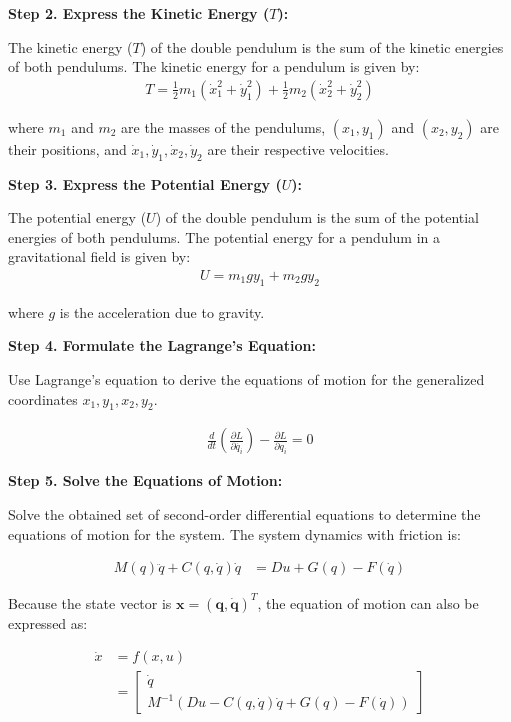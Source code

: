 \textbf{Step 2. Express the Kinetic Energy (\(T\)):}

   The kinetic energy (\(T\)) of the double pendulum is the sum of the kinetic energies of both pendulums. The kinetic energy for a pendulum is given by:
   \begin{align}
        T = \frac{1}{2} m_1 (\dot{x}_1^2 + \dot{y}_1^2) + \frac{1}{2} m_2 (\dot{x}_2^2 + \dot{y}_2^2)
   \end{align}

   where \(m_1\) and \(m_2\) are the masses of the pendulums, \((x_1, y_1)\) and \((x_2, y_2)\) are their positions, and \(\dot{x}_1, \dot{y}_1, \dot{x}_2, \dot{y}_2\) are their respective velocities.

\textbf{Step 3. Express the Potential Energy (\(U\)):}

   The potential energy (\(U\)) of the double pendulum is the sum of the potential energies of both pendulums. The potential energy for a pendulum in a gravitational field is given by:
   \begin{align}
         U = m_1 g y_1 + m_2 g y_2
   \end{align}

   where \(g\) is the acceleration due to gravity.
   
   
\textbf{Step 4. Formulate the Lagrange's Equation:}

   Use Lagrange's equation to derive the equations of motion for the generalized coordinates \(x_1, y_1, x_2, y_2\).

    \begin{align}
    \frac{d}{dt} \left(\frac{\partial L}{\partial \dot{q_i}}\right) - \frac{\partial L}{\partial q_i} = 0
    \end{align}

\textbf{Step 5. Solve the Equations of Motion:}

   Solve the obtained set of second-order differential equations to determine the equations of motion for the system. The system dynamics with friction is:
   
   \begin{align}
        M(q)\ddot{q} + C(q,\dot{q})\dot{q} &= Du + G(q) - F(\dot{q})
   \end{align}
    
    Because the state vector is \(\mathbf{x}=(\mathbf{q},\mathbf{\dot{q}})^T\), the equation of motion can also be expressed as:
    
    \begin{equation}
    \begin{split}
        \dot{x} &= f(x,u) \\
        &= \begin{bmatrix} 
            \dot{q} \\ 
            M^{-1}(Du - C(q,\dot{q})\dot{q} + G(q) - F(\dot{q})) 
       \end{bmatrix}
    \end{split}
    \end{equation}


